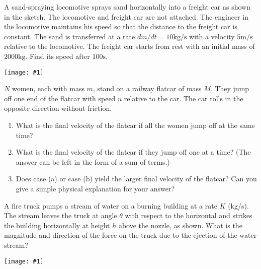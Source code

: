 \documentclass[12pt,letterpaper]{hmcpset}
\newcommand{\diagram}[1]{\begin{center}\texttt{[image: \#1]}\end{center}}
\begin{document}

\begin{problem}
    A sand-spraying locomotive sprays sand 
    horizontally into a freight car as shown 
    in the sketch. The locomotive and freight
    car are not attached. The engineer in the
    locomotive maintains his speed so that the
    distance to the freight car is constant. 
    The sand is transferred at a rate $dm/dt =
    10\text{kg/s}$ with a velocity $5\text{m/s}$
    relative to the locomotive. The freight car
    starts from rest with an initial mass of 
    $2000\text{kg}$. Find its speed after 
    $100\text{s}$.

    \diagram{img/4_13.png}

\end{problem}

\begin{solution}
    \vfill
\end{solution}
\clearpage


\begin{problem}
    $N$ women, each with mass $m$, stand 
    on a railway flatcar of mass $M$. They
    jump off one end of the flatcar with 
    speed $u$ relative to the car. The car
    rolls in the opposite direction without
    friction.

    \begin{enumerate}
    \item What is the final velocity of the
        flatcar if all the women jump off 
        at the same time? 
    \item What is the final velocity of the
        flatcar if they jump off one at a time?
        (The answer can be left in the form 
        of a sum of terms.)
    \item Does case (a) or case (b) yield the
        larger final velocity of the flatcar? 
        Can you give a simple physical
        explanation for your answer? 
    \end{enumerate}
\end{problem}

\begin{solution}
    \vfill
\end{solution}
\clearpage


\begin{problem}
    A fire truck pumps a stream of water 
    on a burning building at a rate $K$ (kg/s). 
    The stream leaves the truck at angle $\theta$
    with respect to the horizontal and strikes 
    the building horizontally at height $h$ 
    above the nozzle, as shown. What is the 
    magnitude and direction of the force on 
    the truck due to the ejection of the water 
    stream?

    \diagram{img/4_21.png}
\end{problem}
\end{document}
